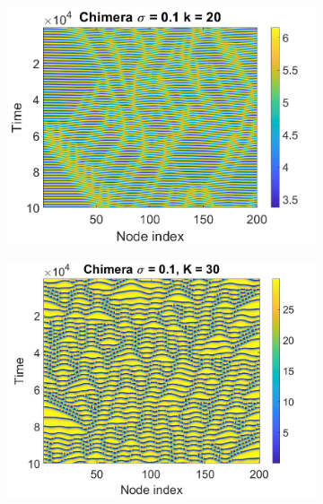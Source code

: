\documentclass[12pt]{article}
\begin{document}
\begin{figure}[h]
    \centering
    \begin{subfigure}[b]{0.32\linewidth}
        \centering
        \includegraphics[width=\textwidth]{Chaos Stuff/plot1.png}
        \label{fig: k20traj}
    \end{subfigure}
    \hfill
    \begin{subfigure}[b]{0.32\linewidth}
        \centering
        \includegraphics[width=\textwidth]{Chaos Stuff/k30chim.jpg}
        \label{fig: k30traj}
    \end{subfigure}
    \hfill
    \begin{subfigure}[b]{0.32\linewidth}
        \centering

\end{subfigure}
\end{figure}
\end{document}
